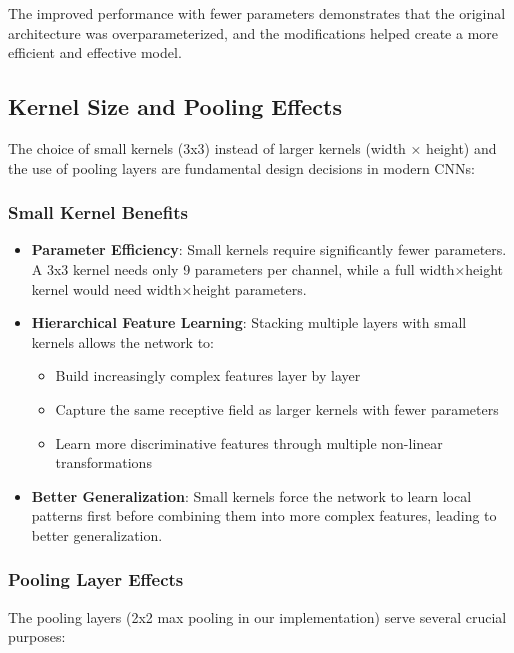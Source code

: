 The improved performance with fewer parameters demonstrates that the original architecture was overparameterized, and the modifications helped create a more efficient and effective model.

\subsection{Kernel Size and Pooling Effects}

The choice of small kernels (3x3) instead of larger kernels (width × height) and the use of pooling layers are fundamental design decisions in modern CNNs:

\subsubsection{Small Kernel Benefits}
\begin{itemize}
    \item \textbf{Parameter Efficiency}: Small kernels require significantly fewer parameters. A 3x3 kernel needs only 9 parameters per channel, while a full width×height kernel would need width×height parameters.
    
    \item \textbf{Hierarchical Feature Learning}: Stacking multiple layers with small kernels allows the network to:
    \begin{itemize}
        \item Build increasingly complex features layer by layer
        \item Capture the same receptive field as larger kernels with fewer parameters
        \item Learn more discriminative features through multiple non-linear transformations
    \end{itemize}
    
    \item \textbf{Better Generalization}: Small kernels force the network to learn local patterns first before combining them into more complex features, leading to better generalization.
\end{itemize}

\subsubsection{Pooling Layer Effects}
The pooling layers (2x2 max pooling in our implementation) serve several crucial purposes:


